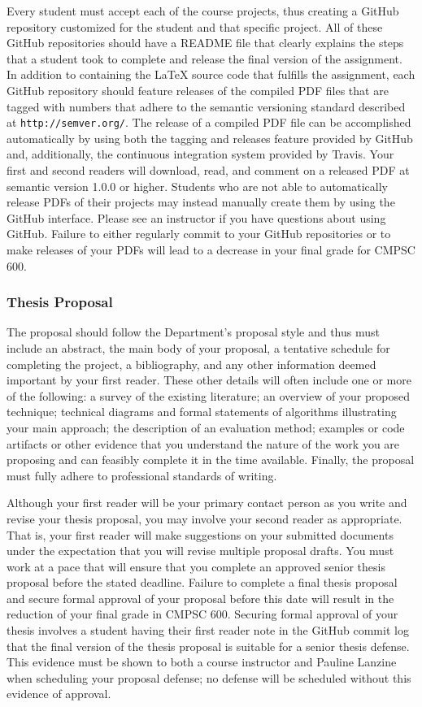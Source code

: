 \documentclass[11pt]{article}
\newcommand{\url}[1]{\lstinline{#1}}
\begin{document}
Every student must accept each of the course projects, thus creating a GitHub
repository customized for the student and that specific project. All of these
GitHub repositories should have a README file that clearly explains the steps
that a student took to complete and release the final version of the assignment.
In addition to containing the \LaTeX{} source code that fulfills the assignment,
each GitHub repository should feature releases of the compiled PDF files that
are tagged with numbers that adhere to the semantic versioning standard
described at \url{http://semver.org/}. The release of a compiled PDF file can be
accomplished automatically by using both the tagging and releases feature
provided by GitHub and, additionally, the continuous integration system provided
by Travis. Your first and second readers will download, read, and comment on a
released PDF at semantic version 1.0.0 or higher. Students who are not able to
automatically release PDFs of their projects may instead manually create them by
using the GitHub interface. Please see an instructor if you have questions about
using GitHub. Failure to either regularly commit to your GitHub repositories or
to make releases of your PDFs will lead to a decrease in your final grade for
CMPSC 600.

\subsubsection*{Thesis Proposal}

The proposal should follow the Department's proposal style and thus must include
an abstract, the main body of your proposal, a tentative schedule for completing
the project, a bibliography, and any other information deemed important by your
first reader. These other details will often include one or more of the
following: a survey of the existing literature; an overview of your proposed
technique; technical diagrams and formal statements of algorithms illustrating
your main approach; the description of an evaluation method; examples or code
artifacts or other evidence that you understand the nature of the work you are
proposing and can feasibly complete it in the time available.  Finally, the
proposal must fully adhere to professional standards of writing.

Although your first reader will be your primary contact person as you write and
revise your thesis proposal, you may involve your second reader as appropriate.
That is, your first reader will make suggestions on your submitted documents
under the expectation that you will revise multiple proposal drafts. You must
work at a pace that will ensure that you complete an approved senior thesis
proposal before the stated deadline. Failure to complete a final thesis proposal
and secure formal approval of your proposal before this date will result in the
reduction of your final grade in CMPSC 600. Securing formal approval of your
thesis involves a student having their first reader note in the GitHub commit
log that the final version of the thesis proposal is suitable for a senior
thesis defense. This evidence must be shown to both a course instructor and
Pauline Lanzine when scheduling your proposal defense; no defense will be
scheduled without this evidence of approval.
\end{document}

